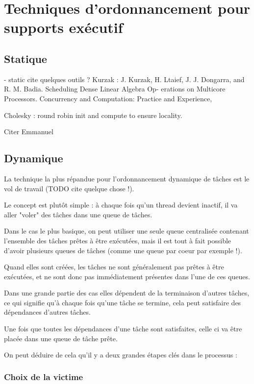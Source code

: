 \section{Techniques d'ordonnancement pour supports exécutif}\label{sec:context:runtimes}

\subsection{Statique}
 - static
 cite quelques outils ?
Kurzak : J. Kurzak, H. Ltaief, J. J. Dongarra, and R. M. Badia. Scheduling Dense Linear Algebra Op- erations on Multicore Processors. Concurrency and Computation: Practice and Experience,

Cholesky : round robin init and compute to ensure locality.

Citer Emmanuel

\subsection{Dynamique}

La technique la plus répandue pour l'ordonnancement dynamique de tâches est le vol de travail (TODO cite quelque chose !).

Le concept est plutôt simple : à chaque fois qu'un thread devient inactif, il va aller "voler" des tâches dans une queue de tâches.

Dans le cas le plus basique, on peut utiliser une seule queue centralisée contenant l'ensemble des tâches prêtes à être exécutées, mais il est tout à fait possible d'avoir plusieurs queues de tâches (comme une queue par coeur par exemple !).

Quand elles sont créées, les tâches ne sont généralement pas prêtes à être exécutées, et ne sont donc pas immédiatement présentes dans l'une de ces queues.

Dans une grande partie des cas elles dépendent de la terminaison d'autres tâches, ce qui signifie qu'à chaque fois qu'une tâche se termine, cela peut satisfaire des dépendances d'autres tâches.

Une fois que toutes les dépendances d'une tâche sont satisfaites, celle ci va être placée dans une queue de tâche prête.

On peut déduire de cela qu'il y a deux grandes étapes clés dans le processus :

\subsubsection{Choix de la victime}

